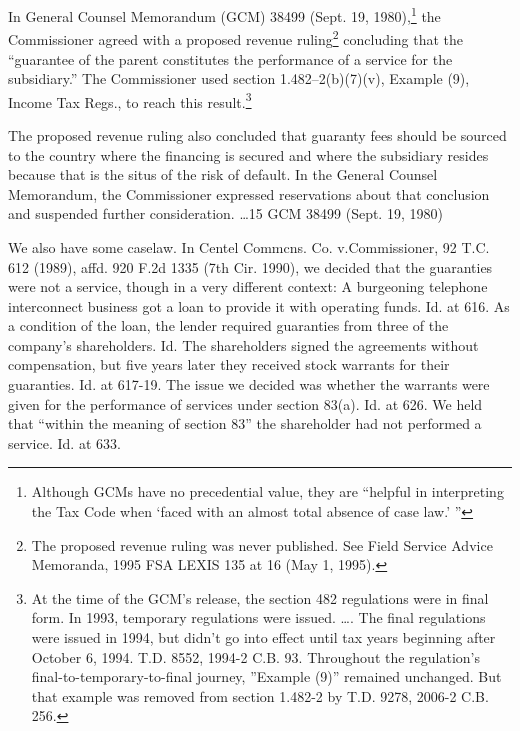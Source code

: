 \begin{select}
In General Counsel Memorandum (GCM) 38499 (Sept. 19, 1980),\footnote[12]{Although GCMs have no precedential value, they are ``helpful in interpreting the Tax Code when `faced with an almost total absence of case law.' ''} the Commissioner agreed with a proposed revenue ruling\footnote[13]{The proposed revenue ruling was never published. See Field Service Advice Memoranda, 1995 FSA LEXIS 135 at 16 (May 1, 1995).} concluding that the ``guarantee of the parent constitutes the performance of a service for the subsidiary.'' The Commissioner used section 1.482--2(b)(7)(v), Example (9), Income Tax Regs., to reach this result.\footnote[14]{At the time of the GCM's release, the section 482 regulations were in final form. In 1993, temporary regulations were issued. \ldots. The final regulations were issued in 1994, but didn't go into effect until tax years beginning after October 6, 1994. T.D. 8552, 1994-2 C.B. 93. Throughout the regulation's final-to-temporary-to-final journey, ''Example (9)'' remained unchanged. But that example was removed from section 1.482-2 by T.D. 9278, 2006-2 C.B. 256.}

The proposed revenue ruling also concluded that guaranty fees should be sourced to the country where the financing is secured and where the subsidiary resides because that is the situs of the risk of default. In the General Counsel Memorandum, the Commissioner expressed reservations about that conclusion and suspended further consideration. \ldots 15 GCM 38499 (Sept. 19, 1980)

We also have some caselaw. In Centel Commcns. Co. v.\@ Commissioner, 92 T.C. 612 (1989), affd. 920 F.2d 1335 (7th Cir. 1990), we decided that the guaranties were not a service, though in a very different context: A burgeoning telephone interconnect business got a loan to provide it with operating funds. Id. at 616. As a condition of the loan, the lender required guaranties from three of the company's shareholders. Id. The shareholders signed the agreements without compensation, but five years later they received stock warrants for their guaranties. Id. at 617-19. The issue we decided was whether the warrants were given for the performance of services under section 83(a). Id. at 626. We held that ``within the meaning of section 83'' the shareholder had not performed a service. Id. at 633.


\end{select}
